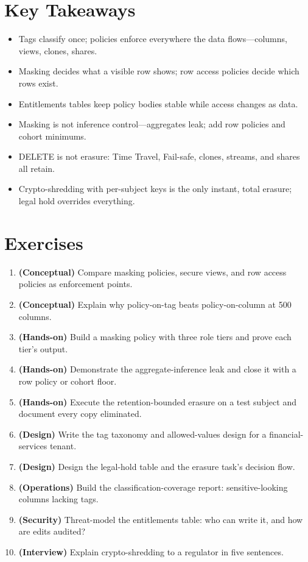 \section*{Key Takeaways}
\begin{itemize}
    \item Tags classify once; policies enforce everywhere the data flows---columns, views, clones, shares.
    \item Masking decides what a visible row shows; row access policies decide which rows exist.
    \item Entitlements tables keep policy bodies stable while access changes as data.
    \item Masking is not inference control---aggregates leak; add row policies and cohort minimums.
    \item DELETE is not erasure: Time Travel, Fail-safe, clones, streams, and shares all retain.
    \item Crypto-shredding with per-subject keys is the only instant, total erasure; legal hold overrides everything.
\end{itemize}

\section{Exercises}
\begin{enumerate}
    \item \textbf{(Conceptual)} Compare masking policies, secure views, and row access policies as enforcement points.
    \item \textbf{(Conceptual)} Explain why policy-on-tag beats policy-on-column at 500 columns.
    \item \textbf{(Hands-on)} Build a masking policy with three role tiers and prove each tier's output.
    \item \textbf{(Hands-on)} Demonstrate the aggregate-inference leak and close it with a row policy or cohort floor.
    \item \textbf{(Hands-on)} Execute the retention-bounded erasure on a test subject and document every copy eliminated.
    \item \textbf{(Design)} Write the tag taxonomy and allowed-values design for a financial-services tenant.
    \item \textbf{(Design)} Design the legal-hold table and the erasure task's decision flow.
    \item \textbf{(Operations)} Build the classification-coverage report: sensitive-looking columns lacking tags.
    \item \textbf{(Security)} Threat-model the entitlements table: who can write it, and how are edits audited?
    \item \textbf{(Interview)} Explain crypto-shredding to a regulator in five sentences.
\end{enumerate}
